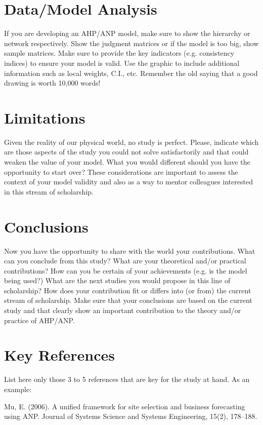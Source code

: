 \documentclass[11pt]{article}
\begin{document}
\section{Data/Model Analysis}
If you are developing an AHP/ANP model, make sure to show the hierarchy or network respectively. Show the judgment matrices or if the model is too big, show sample matrices. Make sure to provide the key indicators (e.g. consistency indices) to ensure your model is valid. Use the graphic to include additional information such as local weights, C.I., etc. Remember the old saying that a good drawing is worth 10,000 words!

\section{Limitations}
Given the reality of our physical world, no study is perfect. Please, indicate which are those aspects of the study you could not solve satisfactorily and that could weaken the value of your model. What you would different should you have the opportunity to start over? These considerations are important to assess the context of your model validity and also as a way to mentor colleagues interested in this stream of scholarship. 

\section{Conclusions}
Now you have the opportunity to share with the world your contributions. What can you conclude from this study? What are your theoretical and/or practical contributions? How can you be certain of your achievements (e.g. is the model being used?) What are the next studies you would propose in this line of scholarship? How does your contribution fit or differs into (or from) the current stream of scholarship. Make sure that your conclusions are based on the current study and that clearly show an important contribution to the theory and/or practice of AHP/ANP. 

\section{Key References}
List here only those 3 to 5 references that are key for the study at hand. As an example:

Mu, E. (2006). A unified framework for site selection and business forecasting using ANP. Journal of Systems Science and Systems Engineering, 15(2), 178–188.
\end{document}
